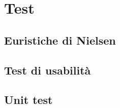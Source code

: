 \section{Test}
\subsection{Euristiche di Nielsen}
\subsection{Test di usabilità}
\subsection{Unit test}